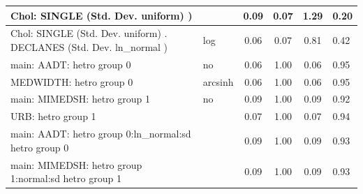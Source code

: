 \begin{table}
\begin{center}
\begin{tabular}{|l|l|c|c|c|l|}
			\hline
			 Chol: SINGLE (Std. Dev. uniform) ) &  & 0.09 & 0.07 & 1.29 & 0.20 \\
			\hline
			 Chol: SINGLE (Std. Dev. uniform) . DECLANES (Std. Dev.   ln_normal ) & log & 0.06 & 0.07 & 0.81 & 0.42 \\
			\hline
			main: AADT: hetro group 0 & no & 0.06 & 1.00 & 0.06 & 0.95 \\
			\hline
			MEDWIDTH: hetro group 0 & arcsinh & 0.06 & 1.00 & 0.06 & 0.95 \\
			\hline
			main: MIMEDSH: hetro group 1 & no & 0.09 & 1.00 & 0.09 & 0.92 \\
			\hline
			URB: hetro group 1 &  & 0.07 & 1.00 & 0.07 & 0.94 \\
			\hline
			main: AADT: hetro group 0:ln_normal:sd  hetro group 0 &  & 0.09 & 1.00 & 0.09 & 0.93 \\
			\hline
			main: MIMEDSH: hetro group 1:normal:sd  hetro group 1 &  & 0.09 & 1.00 & 0.09 & 0.93 \\
			\hline
		\end{tabular}
	\end{center}
\end{table}